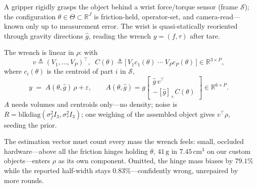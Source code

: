 A gripper rigidly grasps the object behind a wrist force/torque sensor
(frame $\mathcal{S}$); the configuration
$\theta\in\Theta\subset\mathbb{R}^{J}$ is friction-held, operator-set, and
camera-read---known only up to measurement error. The wrist is
quasi-statically reoriented through gravity directions $\hat g$, reading the
wrench $y=(f,\tau)$ after tare.

The wrench is linear in $\rho$: with
%
\begin{equation}
v \triangleq (V_1,\dots,V_P)^{\!\top}\!,\;\;
C(\theta) \triangleq
\big[\,V_1c_1(\theta)\;\cdots\;V_Pc_P(\theta)\,\big]
\in\mathbb{R}^{3\times P}\!,
\label{eq:vC}
\end{equation}
%
where $c_i(\theta)$ is the centroid of part $i$ in $\mathcal{S}$,
%
\begin{equation}
y \;=\; A(\theta,\hat g)\,\rho+\varepsilon,
\qquad
A(\theta,\hat g)=g\!\begin{bmatrix}\hat g\,v^{\!\top}\\[2pt]
-[\hat g]_\times C(\theta)\end{bmatrix}\!\in\mathbb{R}^{6\times P}.
\label{eq:regressor}
\end{equation}
%
$A$ needs volumes and centroids only---no density; noise is
$R=\mathrm{blkdiag}(\sigma_f^2I_3,\sigma_\tau^2I_3)$; one weighing of the
assembled object gives $v^{\!\top}\!\rho$, seeding the prior.

The estimation vector must count every mass the wrench feels: small, occluded
hardware---above all the friction hinges holding $\theta$, $41\,\mathrm{g}$
in $7.45\,\mathrm{cm}^3$ on our custom objects---enters $\rho$ as its own
component. Omitted, the hinge mass biases by $79.1\%$ while the reported
half-width stays $0.83\%$---confidently wrong, unrepaired by more rounds.

